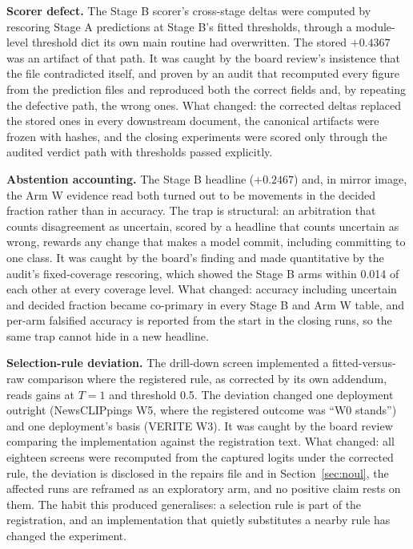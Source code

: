 \documentclass{article} %
\begin{document}
\textbf{Scorer defect.} The Stage B scorer's cross-stage deltas were computed by rescoring Stage A predictions at Stage B's fitted thresholds, through a module-level threshold dict its own main routine had overwritten. The stored \(+0.4367\) was an artifact of that path. It was caught by the board review's insistence that the file contradicted itself, and proven by an audit that recomputed every figure from the prediction files and reproduced both the correct fields and, by repeating the defective path, the wrong ones. What changed: the corrected deltas replaced the stored ones in every downstream document, the canonical artifacts were frozen with hashes, and the closing experiments were scored only through the audited verdict path with thresholds passed explicitly.

\textbf{Abstention accounting.} The Stage B headline (\(+0.2467\)) and, in mirror image, the Arm W evidence read both turned out to be movements in the decided fraction rather than in accuracy. The trap is structural: an arbitration that counts disagreement as uncertain, scored by a headline that counts uncertain as wrong, rewards any change that makes a model commit, including committing to one class. It was caught by the board's finding and made quantitative by the audit's fixed-coverage rescoring, which showed the Stage B arms within 0.014 of each other at every coverage level. What changed: accuracy including uncertain and decided fraction became co-primary in every Stage B and Arm W table, and per-arm falsified accuracy is reported from the start in the closing runs, so the same trap cannot hide in a new headline.

\textbf{Selection-rule deviation.} The drill-down screen implemented a fitted-versus-raw comparison where the registered rule, as corrected by its own addendum, reads gains at \(T=1\) and threshold 0.5. The deviation changed one deployment outright (NewsCLIPpings W5, where the registered outcome was ``W0 stands'') and one deployment's basis (VERITE W3). It was caught by the board review comparing the implementation against the registration text. What changed: all eighteen screens were recomputed from the captured logits under the corrected rule, the deviation is disclosed in the repairs file and in Section~\ref{sec:noul}, the affected runs are reframed as an exploratory arm, and no positive claim rests on them. The habit this produced generalises: a selection rule is part of the registration, and an implementation that quietly substitutes a nearby rule has changed the experiment.
\end{document}
